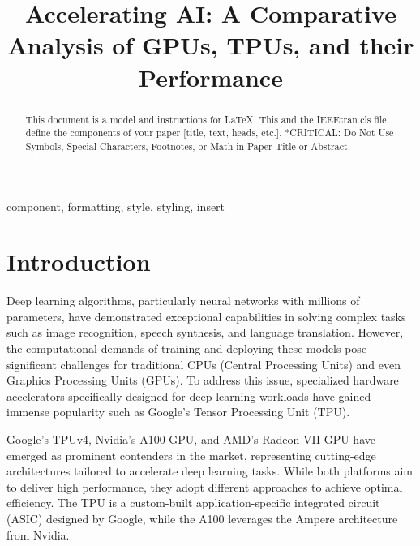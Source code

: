 \documentclass[conference]{IEEEtran}
\begin{document}
    \title{Accelerating AI: A Comparative Analysis of GPUs, TPUs, and their Performance}

    \author{
    }

    \maketitle

    \begin{abstract}
        This document is a model and instructions for \LaTeX.
        This and the IEEEtran.cls file define the components of your paper [title, text, heads, etc.].
        *CRITICAL: Do Not Use Symbols, Special Characters, Footnotes,
        or Math in Paper Title or Abstract.
    \end{abstract}

    \begin{IEEEkeywords}
        component, formatting, style, styling, insert
    \end{IEEEkeywords}


    \section{Introduction}
    \label{sec:introduction}

    Deep learning algorithms, particularly neural networks with millions of parameters, have demonstrated exceptional capabilities in solving complex tasks such as image recognition, speech synthesis, and language translation.
    However, the computational demands of training and deploying these models pose significant challenges for traditional CPUs (Central Processing Units) and even Graphics Processing Units (GPUs).
    To address this issue, specialized hardware accelerators specifically designed for deep learning workloads have gained immense popularity such as Google's Tensor Processing Unit (TPU).

    Google's TPUv4, Nvidia's A100 GPU, and AMD's Radeon VII GPU have emerged as prominent contenders in the market, representing cutting-edge architectures tailored to accelerate deep learning tasks.
    While both platforms aim to deliver high performance, they adopt different approaches to achieve optimal efficiency.
    The TPU is a custom-built application-specific integrated circuit (ASIC) designed by Google, while the A100 leverages the Ampere architecture from Nvidia.
\end{document}
